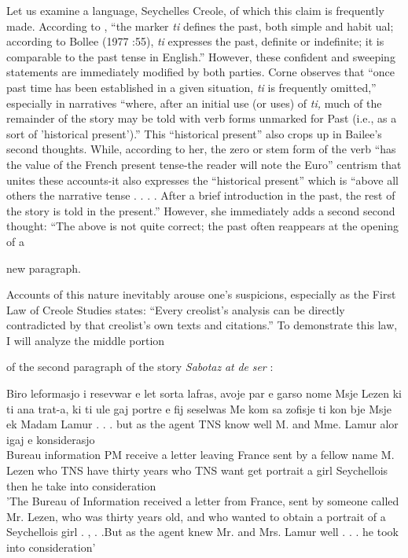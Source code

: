 Let us examine a language, Seychelles Creole, of which this claim is frequently made. According to \citet[102]{Corne1977}, ``the marker \textit{ti} defines the past, both simple and habit ual{\textquotedbl}; according to Bollee (1977 :55), \textit{{\textquotedbl}ti} expresses the past, definite or indefinite; it is comparable to the past tense in English.'' However, these confident and sweeping statements are immediately modified by both parties. Corne observes that ``once past time has been established in a given situation, \textit{ti} is frequently omitted,'' especially in narratives ``where, after an initial use (or uses) of \textit{ti,} much of the remainder of the story may be told with verb forms unmarked for Past (i.e., as a sort of 'historical present').'' This ``historical present'' also crops up in Bailee's second thoughts. While, according to her, the zero or stem form of the verb ``has the value of the French present tense{\textquotedbl}{}-the reader will note the Euro'' centrism that unites these accounts{}-it also expresses the ``historical present'' which is ``above all others the narrative tense . . . . After a brief introduction in the past, the rest of the story is told in the pres\-ent.'' However, she immediately adds a second second thought: ``The above is not quite correct; the past often reappears at the opening of a

new paragraph.{\textquotedbl}

Accounts of this nature inevitably arouse one's suspicions, especially as the First Law of Creole Studies states: ``Every creolist's analysis can be directly contradicted by that creolist's own texts and citations.'' To demonstrate this law, I will analyze the middle portion

of the second paragraph of the story \textit{Sabotaz} \textit{at} \textit{de} \textit{ser} \citep[166]{Bollee1977}:


\ea\label{ex:94}
 {Biro} {le}{formasjo} {i} resevwar {e} {let} {sorta} {lafras,}
{avoje} {par} {e} {garso} {nome} {M}{sje} {Lezen} {ki} ti ana {trat-a,}
{ki} ti ule {gaj} {portre} {e} {fij} {seselwas}  
{Me} {kom} {sa} {zofisje} ti kon {b}{je} {Msje} {ek} {M}{adam} {Lamur} {.} . . but as the agent TNS know well M. and Mme. Lamur {alor} igaj {e} {konsiderasjo} \\
Bureau information PM receive a letter leaving France sent by a fellow name M. Lezen who TNS have thirty years who TNS want get portrait a girl Seychellois then he take into consideration\\
\glt 'The Bureau of Information received a letter from France, sent by someone called Mr. Lezen, who was thirty years old, and who wanted to obtain a portrait of a Seychellois girl . , . .But as the agent knew Mr. and Mrs. Lamur well . . . he took into consideration'
\z





